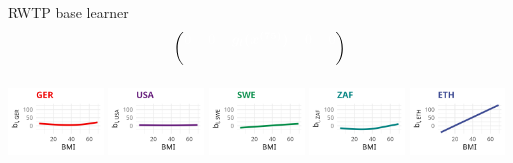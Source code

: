 \documentclass[t,10pt]{beamer}
\begin{document}
\begin{frame}{RWTP base learner}
$$\begin{blockarray}{ccccc}
\begin{block}{(ccccc)}
      \color{white}0 & \color{white}0 & \color{white}\bm{g_l(x^{(75)})} & \color{white}0 & \color{white}0 \\
      \phantom{x}\\
    \end{block}
  \end{blockarray}
  $$
  \normalsize
  {\includegraphics[width=0.19\textwidth]{figures/bs-tensor/fig-tensor-GER.png}}
  \includegraphics[width=0.19\textwidth]{figures/bs-tensor/fig-tensor-USA.png}
  {\includegraphics[width=0.19\textwidth]{figures/bs-tensor/fig-tensor-SWE.png}}
  {\includegraphics[width=0.19\textwidth]{figures/bs-tensor/fig-tensor-ZAF.png}}
  {\includegraphics[width=0.19\textwidth]{figures/bs-tensor/fig-tensor-ETH.png}}
\end{frame}
\end{document}
